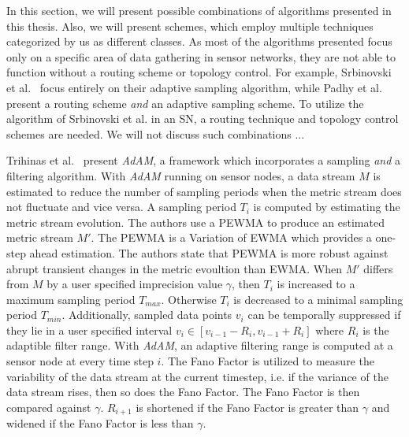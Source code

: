 In this section, we will present possible combinations of algorithms presented
in this thesis. Also, we will present schemes, which employ multiple techniques
categorized by us as different classes. As most of the algorithms presented
focus only on a specific area of data gathering in sensor networks, they are
not able to function without a routing scheme or topology control. For example,
Srbinovski et al.~\cite{srbinovski2016energy} focus entirely on their adaptive
sampling algorithm, while Padhy et al.~\cite{padhy2006utility} present a
routing scheme \textit{and} an adaptive sampling scheme. To utilize the
algorithm of Srbinovski et al. in an \ac{SN}, a routing technique and topology
control schemes are needed. We will not discuss such combinations ...


Trihinas et al.~\cite{trihinas2015adam} present \textit{AdAM}, a framework
which incorporates a sampling \textit{and} a filtering algorithm. With
\textit{AdAM} running on sensor nodes, a data stream $ M $ is estimated to
reduce the number of sampling periods when the metric stream does not fluctuate
and vice versa. A sampling period $ T_i $ is computed by estimating the metric
stream evolution. The authors use a \ac{PEWMA} to produce an estimated metric
stream $ M' $. The \ac{PEWMA} is a Variation of \ac{EWMA} which provides a
one-step ahead estimation. The authors state that \ac{PEWMA} is more robust
against abrupt transient changes in the metric evoultion than \ac{EWMA}. When $
M' $ differs from $ M $ by a user specified imprecision value $
\gamma $, then $ T_i $ is increased to a maximum sampling period $ T_{max}
$. Otherwise $ T_i $ is decreased to a minimal sampling period $ T_{min} $.
Additionally, sampled data points $ v_{i} $ can be temporally suppressed if
they lie in a user specified interval $ v_i \in [v_{i-1} - R_i, v_{i-1} + R_i]
$ where $ R_i $ is the adaptible filter range. With \textit{AdAM}, an adaptive
filtering range is computed at a sensor node at every time step $ i $. The Fano
Factor is utilized to measure the variability of the data stream at the current
timestep, i.e. if the variance of the data stream rises, then so does the Fano
Factor. The Fano Factor is then compared against $ \gamma $. $ R_{i+1} $ is
shortened if the Fano Factor is greater than $ \gamma $ and widened if the Fano
Factor is less than $ \gamma $.


